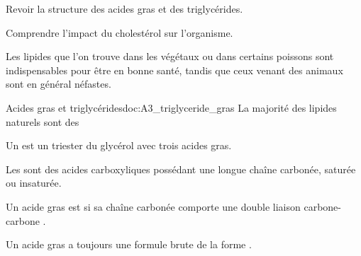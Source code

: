 \teteTermStssBiom

\vspace*{-38pt}

\begin{objectifs}
  \item Revoir la structure des acides gras et des triglycérides.
  \item Comprendre l'impact du cholestérol sur l'organisme.
\end{objectifs}

\begin{contexte}
  Les lipides que l'on trouve dans les végétaux ou dans certains poissons sont indispensables pour être en bonne santé, tandis que ceux venant des animaux sont en général néfastes.
  
\end{contexte}


\begin{doc}{Acides gras et triglycérides}{doc:A3_triglyceride_gras}
  La majorité des lipides naturels sont des 
  \begin{importants}
    Un  est un triester du glycérol avec trois acides gras.
    
    Les  sont des acides carboxyliques possédant une longue chaîne carbonée, saturée ou insaturée.
    
    Un acide gras est  si sa chaîne carbonée comporte une double liaison carbone-carbone .
  \end{importants}
  Un acide gras  a toujours une formule brute de la forme .
\end{doc}

